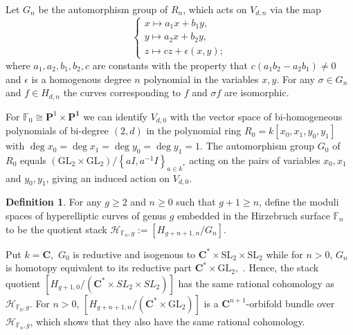 \documentclass[10pt,a4paper,twoside]{amsart}
\theoremstyle{plain}
\theoremstyle{definition}
\newtheorem{defin}{Definition}
\theoremstyle{remark}
\begin{document}
Let $G_n$ be the automorphism group of $R_n$, which acts on $V_{d,n}$ via the map
\begin{equation*}
\begin{cases}
x\mapsto a_1x+b_1y,\\
y\mapsto a_2x+b_2y,\\
z\mapsto cz+\epsilon(x,y);
\end{cases}
\end{equation*}
where $a_1,a_2,b_1,b_2,c$ are constants with the property that $c(a_1b_2-a_2b_1)\neq 0$ and $\epsilon$ is a homogenous degree $n$ polynomial in the variables $x,y$.
For any $\sigma \in G_n$ and $f \in H_{d,n}$ the curves corresponding to $f$ and $\sigma f$ are isomorphic. 

For $\mathbb{F}_0\cong \mathbf{P}^1\times\mathbf{P^1}$ we can identify $V_{d,0}$ with the vector space of bi-homogeneous polynomials of bi-degree $(2,d)$ in the polynomial ring $R_0=k\left[x_0,x_1,y_0,y_1\right]$ with $\deg x_0=\deg x_1=\deg y_0=\deg y_1=1$. The automorphism group $G_0$ of $R_0$ equals $(\mathrm{GL}_2\times \mathrm{GL}_2)/\left\{aI,a^{-1}I\right\}_{a\in k^*}$ acting on the pairs of variables $x_0,x_1$ and $y_0,y_1$,  giving an induced action on $V_{d,0}$. 

\begin{defin}
For any $g \geq 2$ and $n\geq 0$ such that $g+1 \geq n$, define the moduli spaces of hyperelliptic curves of genus $g$ embedded in the Hirzebruch surface $\mathbb{F}_{n}$ to be the quotient stack $\mathcal{H}_{\mathbb{F}_n,g}:=\left[H_{g+n+1,n}/G_{n} \right]$. 
\end{defin}

Put $k=\mathbf{C},$ $G_0$ is reductive and isogenous to $\mathbf{C}^*\times \mathrm{SL}_2\times \mathrm{SL}_2$ while for $n>0$, $G_n$ is homotopy equivalent to its reductive part $\mathbf{C}^*\times \mathrm{GL}_2,$ \cite[Section 4]{Zhe}. Hence,  the stack quotient $\left[H_{g+1,0}/(\mathbf{C}^*\times SL_2\times SL_2)\right]$ has the same rational cohomology as $\mathcal{H}_{\mathbb{F}_0,g}$. For $n>0$, $\left[H_{g+n+1,n}/(\mathbf{C}^*\times \mathrm{GL}_2)\right]$ is a $\mathbf{C}^{n+1}\mbox{-}$orbifold bundle over $\mathcal{H}_{\mathbb{F}_n,g}$, which shows that they also have the same rational cohomology. 
\end{document}
